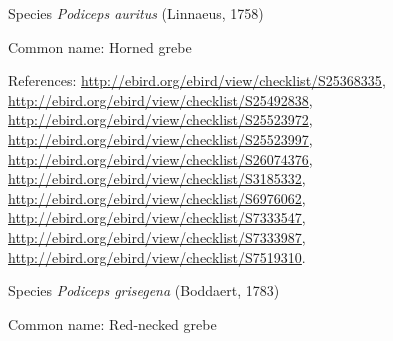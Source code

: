 \documentclass[9pt, article]{memoir}
\begin{document}
\begin{multicols}{2}
\vspace{6pt}\noindent\hspace{36pt}Species \textit{Podiceps auritus} (Linnaeus, 1758)


Common name: Horned grebe

References: 
\url{http://ebird.org/ebird/view/checklist/S25368335}, 
\url{http://ebird.org/ebird/view/checklist/S25492838}, 
\url{http://ebird.org/ebird/view/checklist/S25523972}, 
\url{http://ebird.org/ebird/view/checklist/S25523997}, 
\url{http://ebird.org/ebird/view/checklist/S26074376}, 
\url{http://ebird.org/ebird/view/checklist/S3185332}, 
\url{http://ebird.org/ebird/view/checklist/S6976062}, 
\url{http://ebird.org/ebird/view/checklist/S7333547}, 
\url{http://ebird.org/ebird/view/checklist/S7333987}, 
\url{http://ebird.org/ebird/view/checklist/S7519310}.

\vspace{6pt}\noindent\hspace{36pt}Species \textit{Podiceps grisegena} (Boddaert, 1783)


Common name: Red-necked grebe


\end{multicols}
\end{document}
